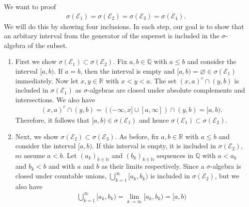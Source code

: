 \begin{solution}
    We want to proof
    \begin{align}
        \sigma (\mathcal{E}_1) = \sigma (\mathcal{E}_2) = \sigma (\mathcal{E}_3) = \sigma (\mathcal{E}_4) \text{.}
    \end{align}
    We will do this by showing four inclusions. In each step, our goal is to show that an arbitary interval from the generator of the superset is included in the \(\sigma\)-algebra of the subset.
    \begin{enumerate}
    \item First we show \(\sigma (\mathcal{E}_1) \subset \sigma (\mathcal{E}_2)\). Fix \(a, b \in \mathbb{Q}\) with \(a \leq b\) and consider the interval \([a, b)\). If \(a = b\), then the interval is empty and \([a, b) = \varnothing \in \sigma (\mathcal{E}_1)\) immediately. Now let \(x, y \in \mathbb{R}\) with \(x < y < a\). The set \((x, a)^c \cap (y, b)\) is included in \(\sigma (\mathcal{E}_1)\) as \(\sigma\)-algebras are closed under absolute complements and intersections. We also have
    \begin{align}
        (x, a)^c \cap (y, b) = \left( (-\infty, x] \cup [a, \infty] \right) \cap (y, b) = [a, b) \text{.}
    \end{align}
    Therefore, it follows that \([a, b) \in \sigma (\mathcal{E}_1) \) and hence \(\sigma (\mathcal{E}_1) \subset \sigma (\mathcal{E}_2)\).
    \item Next, we show \( \sigma (\mathcal{E}_2) \subset \sigma (\mathcal{E}_3) \). As before, fix \(a, b \in \mathbb{R}\) with \(a \leq b\) and consider the interval \([a, b)\). If this interval is empty, it is included in \(\sigma (\mathcal{E}_2)\), so assume \(a < b\). Let \((a_k)_{k \in \mathbb{N}}\) and \((b_k)_{k \in \mathbb{N}}\) sequences in \(\mathbb{Q}\) with \(a < a_k\) and \(b_k < b\) and with \(a\) and \(b\) as their limits respectively. Since a \(\sigma\)-algebra is closed under countable unions, \(\bigcup_{k=1}^\infty [a_k, b_k)\) is included in \(\sigma (\mathcal{E}_2)\), but we also have
    \begin{align}
        \bigcup_{k=1}^\infty [a_k, b_k) = \lim_{k \rightarrow \infty} [a_k, b_k) = [a, b)
    \end{align}
    \end{enumerate}
\end{solution}